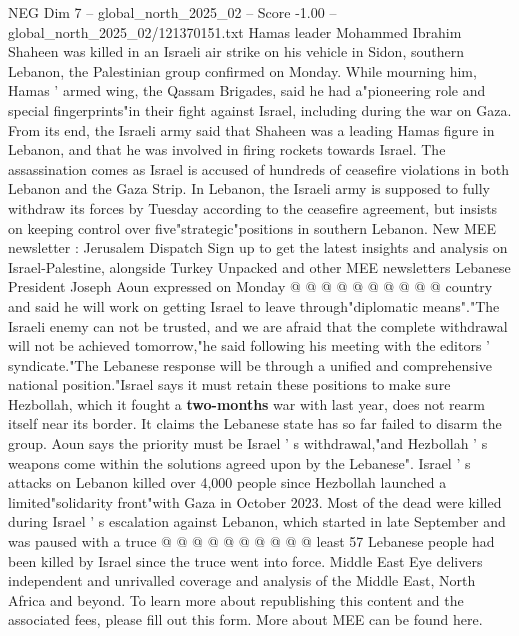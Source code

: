 \begin{textsample}{NEG Dim 7 – global\_north\_2025\_02 – Score -1.00 – global\_north\_2025\_02/121370151.txt}  \label{ex:f7_neg_172}
Hamas leader Mohammed Ibrahim Shaheen was killed in an Israeli air strike on his vehicle in Sidon, southern Lebanon, the Palestinian group confirmed on Monday.
While mourning him, Hamas ' armed wing, the Qassam Brigades, said he had a"pioneering role and special fingerprints"in their fight against Israel, including during the war on Gaza.
From its end, the Israeli army said that Shaheen was a leading Hamas figure in Lebanon, and that he was involved in firing rockets towards Israel.
The assassination comes as Israel is accused of hundreds of ceasefire violations in both Lebanon and the Gaza Strip.
In Lebanon, the Israeli army is supposed to fully withdraw its forces by Tuesday according to the ceasefire agreement, but insists on keeping control over five"strategic"positions in southern Lebanon.
New MEE newsletter : Jerusalem Dispatch Sign up to get the latest insights and analysis on Israel-Palestine, alongside Turkey Unpacked and other MEE newsletters Lebanese President Joseph Aoun expressed on Monday @ @ @ @ @ @ @ @ @ @ country and said he will work on getting Israel to leave through"diplomatic means"."The Israeli enemy can not be trusted, and we are afraid that the complete withdrawal will not be achieved tomorrow,"he said following his meeting with the editors ' syndicate."The Lebanese response will be through a unified and comprehensive national position."Israel says it must retain these positions to make sure Hezbollah, which it fought a \textbf{two-months} war with last year, does not rearm itself near its border.
It claims the Lebanese state has so far failed to disarm the group.
Aoun says the priority must be Israel ' s withdrawal,"and Hezbollah ' s weapons come within the solutions agreed upon by the Lebanese".
Israel ' s attacks on Lebanon killed over 4,000 people since Hezbollah launched a limited"solidarity front"with Gaza in October 2023.
Most of the dead were killed during Israel ' s escalation against Lebanon, which started in late September and was paused with a truce @ @ @ @ @ @ @ @ @ @ least 57 Lebanese people had been killed by Israel since the truce went into force.
Middle East Eye delivers independent and unrivalled coverage and analysis of the Middle East, North Africa and beyond.
To learn more about republishing this content and the associated fees, please fill out this form.
More about MEE can be found here.

\end{textsample}
